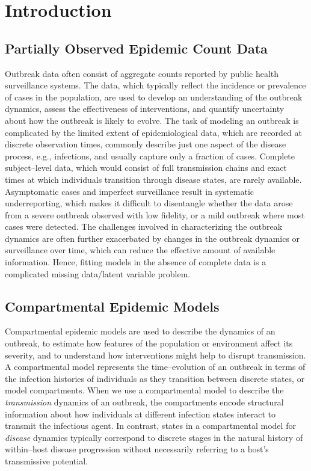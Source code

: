 \chapter{Introduction}
\label{chap:introduction}

\section{Partially Observed Epidemic Count Data}
\label{sec:data_background}

Outbreak data often consist of aggregate counts reported by public health surveillance systems. The data, which typically reflect the incidence or prevalence of cases in the population, are used to develop an understanding of the outbreak dynamics, assess the effectiveness of interventions, and quantify uncertainty about how the outbreak is likely to evolve. The task of modeling an outbreak is complicated by the limited extent of epidemiological data, which are recorded at discrete observation times, commonly describe just one aspect of the disease process, e.g., infections, and usually capture only a fraction of cases. Complete subject--level data, which would consist of full transmission chains and exact times at which individuals transition through disease states, are rarely available. Asymptomatic cases and imperfect surveillance result in systematic underreporting, which makes it difficult to disentangle whether the data arose from a severe outbreak observed with low fidelity, or a mild outbreak where most cases were detected. The challenges involved in characterizing the outbreak dynamics are often further exacerbated by changes in the outbreak dynamics or surveillance over time, which can reduce the effective amount of available information. Hence, fitting models in the absence of complete data is a complicated missing data/latent variable problem. 

\section{Compartmental Epidemic Models}
\label{sec:outbreak_models}

Compartmental epidemic models are used to describe the dynamics of an outbreak, to estimate how features of the population or environment affect its severity, and to understand how interventions might help to disrupt transmission. A compartmental model represents the time--evolution of an outbreak in terms of the infection histories of individuals as they transition between discrete states, or model compartments. When we use a compartmental model to describe the \textit{transmission} dynamics of an outbreak, the compartments encode structural information about how individuals at different infection states interact to transmit the infectious agent. In contrast, states in a compartmental model for \textit{disease} dynamics typically correspond to discrete stages in the natural history of within--host disease progression without necessarily referring to a host's transmissive potential. 

